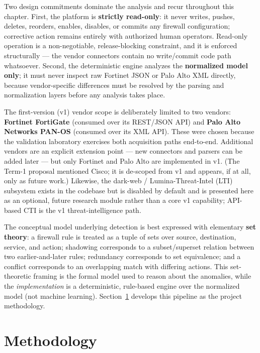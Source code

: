 Two design commitments dominate the analysis and recur throughout this chapter. First, the platform is \textbf{strictly read-only}: it never writes, pushes, deletes, reorders, enables, disables, or commits any firewall configuration; corrective action remains entirely with authorized human operators. Read-only operation is a non-negotiable, release-blocking constraint, and it is enforced structurally — the vendor connectors contain no write/commit code path whatsoever. Second, the deterministic engine analyzes the \textbf{normalized model only}; it must never inspect raw Fortinet JSON or Palo Alto XML directly, because vendor-specific differences must be resolved by the parsing and normalization layers before any analysis takes place.

The first-version (v1) vendor scope is deliberately limited to two vendors: \textbf{Fortinet FortiGate} (consumed over its REST/JSON API) and \textbf{Palo Alto Networks PAN-OS} (consumed over its XML API). These were chosen because the validation laboratory exercises both acquisition paths end-to-end. Additional vendors are an explicit extension point — new connectors and parsers can be added later — but only Fortinet and Palo Alto are implemented in v1. (The Term-1 proposal mentioned Cisco; it is de-scoped from v1 and appears, if at all, only as future work.) Likewise, the dark-web / Lumina-Threat-Intel (LTI) subsystem exists in the codebase but is disabled by default and is presented here as an optional, future research module rather than a core v1 capability; API-based CTI is the v1 threat-intelligence path.

The conceptual model underlying detection is best expressed with elementary \textbf{set theory}: a firewall rule is treated as a tuple of sets over source, destination, service, and action; shadowing corresponds to a subset/superset relation between two earlier-and-later rules; redundancy corresponds to set equivalence; and a conflict corresponds to an overlapping match with differing actions. This set-theoretic framing is the formal model used to reason about the anomalies, while the \emph{implementation} is a deterministic, rule-based engine over the normalized model (not machine learning). Section~\ref{sec:ch3-methodology} develops this pipeline as the project methodology.

\section{Methodology}
\label{sec:ch3-methodology}

